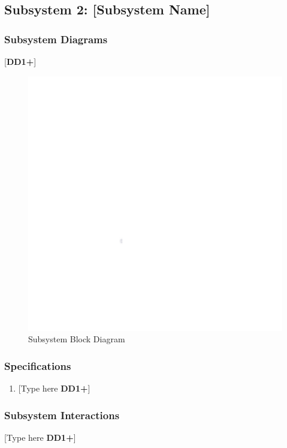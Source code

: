 \clearpage
\subsection{Subsystem 2: [Subsystem Name]}

\subsubsection{Subsystem Diagrams}
[\textbf{DD1+}]
\begin{figure}[h]
    \centering
    \includegraphics[width=16cm]{images/white.png} %
    \caption{Subsystem Block Diagram}
\end{figure} %

\subsubsection{Specifications}
\begin{enumerate}
    \item {[Type here \textbf{DD1+}]}
\end{enumerate}

\subsubsection{Subsystem Interactions}
[Type here \textbf{DD1+}]

